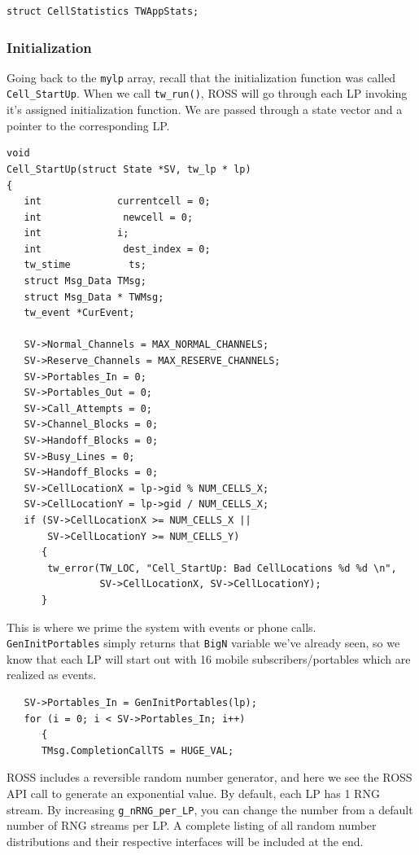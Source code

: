 \documentclass[12pt]{article}
\begin{document}
\begin{verbatim}
struct CellStatistics TWAppStats;
\end{verbatim}
 
\subsubsection{Initialization}
Going back to the {\tt mylp} array, recall that the initialization function
was called {\tt Cell\_StartUp}.  When we call {\tt tw\_run()}, ROSS will go through
each LP invoking it's assigned initialization function.  We are passed
through a state vector and a pointer to the corresponding LP.

\begin{verbatim}
void
Cell_StartUp(struct State *SV, tw_lp * lp)
{
   int             currentcell = 0;
   int              newcell = 0;
   int             i;
   int              dest_index = 0;
   tw_stime          ts;
   struct Msg_Data TMsg;
   struct Msg_Data * TWMsg;
   tw_event *CurEvent;

   SV->Normal_Channels = MAX_NORMAL_CHANNELS;
   SV->Reserve_Channels = MAX_RESERVE_CHANNELS;
   SV->Portables_In = 0;
   SV->Portables_Out = 0;
   SV->Call_Attempts = 0;
   SV->Channel_Blocks = 0;
   SV->Handoff_Blocks = 0;
   SV->Busy_Lines = 0;
   SV->Handoff_Blocks = 0;
   SV->CellLocationX = lp->gid % NUM_CELLS_X;
   SV->CellLocationY = lp->gid / NUM_CELLS_X;
   if (SV->CellLocationX >= NUM_CELLS_X ||
       SV->CellLocationY >= NUM_CELLS_Y)
      {
       tw_error(TW_LOC, "Cell_StartUp: Bad CellLocations %d %d \n",
                SV->CellLocationX, SV->CellLocationY);
      }
\end{verbatim}

This is where we prime the system with events or phone calls.  {\tt
GenInitPortables} simply returns that {\tt BigN} variable we've
already seen, so we know that each LP will start out with 16 mobile
subscribers/portables which are realized as events.

\begin{verbatim}
   SV->Portables_In = GenInitPortables(lp);
   for (i = 0; i < SV->Portables_In; i++)
      {
      TMsg.CompletionCallTS = HUGE_VAL;
\end{verbatim}

ROSS includes a reversible random number generator, and here we see the ROSS
API call to generate an exponential value.  By default, each LP has 1 RNG
stream. By increasing {\tt g\_nRNG\_per\_LP}, you can change the number from a
default number of RNG streams per LP.  A complete listing of all random number
distributions and their respective interfaces will be included at the end.
\end{document}
